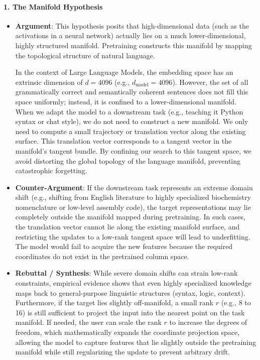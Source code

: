 \paragraph{1. The Manifold Hypothesis}
\begin{itemize}
  \item \textbf{Argument}: This hypothesis posits that high-dimensional data (such as the activations in a neural network) actually lies on a much lower-dimensional, highly structured manifold. Pretraining constructs this manifold by mapping the topological structure of natural language.
  
  In the context of Large Language Models, the embedding space has an extrinsic dimension of $d = 4096$ (e.g., $d_{\text{model}} = 4096$). However, the set of all grammatically correct and semantically coherent sentences does not fill this space uniformly; instead, it is confined to a lower-dimensional manifold. When we adapt the model to a downstream task (e.g., teaching it Python syntax or chat style), we do not need to construct a new manifold. We only need to compute a small trajectory or translation vector along the existing surface. This translation vector corresponds to a tangent vector in the manifold's tangent bundle. By confining our search to this tangent space, we avoid distorting the global topology of the language manifold, preventing catastrophic forgetting.
  
  \item \textbf{Counter-Argument}: If the downstream task represents an extreme domain shift (e.g., shifting from English literature to highly specialized biochemistry nomenclature or low-level assembly code), the target representations may lie completely outside the manifold mapped during pretraining. In such cases, the translation vector cannot lie along the existing manifold surface, and restricting the updates to a low-rank tangent space will lead to underfitting. The model would fail to acquire the new features because the required coordinates do not exist in the pretrained column space.
  
  \item \textbf{Rebuttal / Synthesis}: While severe domain shifts can strain low-rank constraints, empirical evidence shows that even highly specialized knowledge maps back to general-purpose linguistic structures (syntax, logic, context). Furthermore, if the target lies slightly off-manifold, a small rank $r$ (e.g., 8 to 16) is still sufficient to project the input into the nearest point on the task manifold. If needed, the user can scale the rank $r$ to increase the degrees of freedom, which mathematically expands the coordinate projection space, allowing the model to capture features that lie slightly outside the pretraining manifold while still regularizing the update to prevent arbitrary drift.
\end{itemize}

